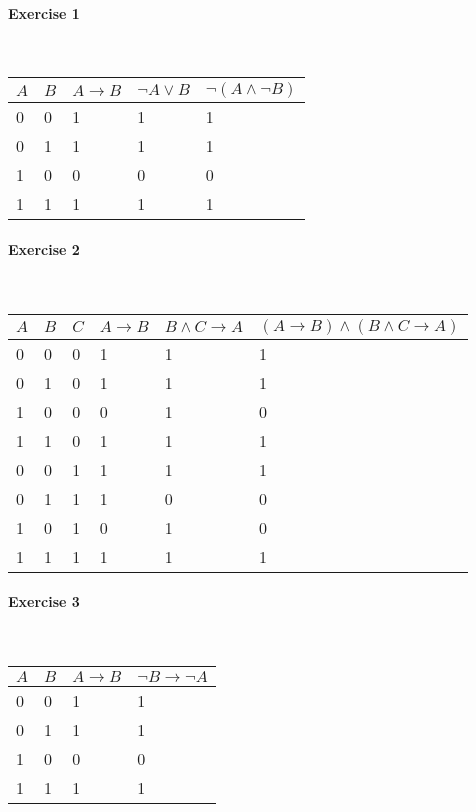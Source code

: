 \documentclass{article}
\begin{document}
	\paragraph{Exercise 1} ~\\
	\begin{table}[h!]
		\begin{tabular}{| l | l | l | l | l |}
			\hline
			$A$ & $B$ & $A \rightarrow B$ & $\neg A \lor B$ & $\neg(A \land \neg B)$\\ \hline
			0 & 0 & 1 & 1 & 1\\
			0 & 1 & 1 & 1 & 1\\
			1 & 0 & 0 & 0 & 0\\
			1 & 1 & 1 & 1 & 1\\
			\hline
		\end{tabular}
	\end{table}
	\paragraph{Exercise 2} ~\\
	\begin{table}[h!]
		\begin{tabular}{| l | l | l | l | l | l |}
			\hline
			$A$ & $B$ & $C$ & $A \rightarrow B$ & $B \land C \rightarrow A$ & $(A \rightarrow B) \land (B \land C \rightarrow A)$\\ \hline
			0 & 0 & 0 & 1 & 1 & 1\\
			0 & 1 & 0 & 1 & 1 & 1\\
			1 & 0 & 0 & 0 & 1 & 0\\
			1 & 1 & 0 & 1 & 1 & 1\\
			0 & 0 & 1 & 1 & 1 & 1\\
			0 & 1 & 1 & 1 & 0 & 0\\
			1 & 0 & 1 & 0 & 1 & 0\\
			1 & 1 & 1 & 1 & 1 & 1\\
			\hline
		\end{tabular}
	\end{table}
	\paragraph{Exercise 3} ~\\
	\begin{table}[h!]
		\begin{tabular}{| l | l | l | l |}
			\hline
			$A$ & $B$ & $A \rightarrow B$ & $\neg B \rightarrow \neg A$\\ \hline
			0 & 0 & 1 & 1\\
			0 & 1 & 1 & 1\\
			1 & 0 & 0 & 0\\
			1 & 1 & 1 & 1\\
			\hline
		\end{tabular}
	\end{table}
	\pagebreak
\end{document}
